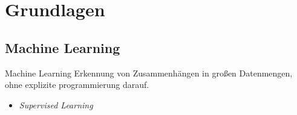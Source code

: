 \section[\thesection \  Grundlagen]{Grundlagen}\label{sec:grundlagen}



\subsection[\thesection .\thesubsection \ 
Machine Learning]{Machine Learning}\label{subsec:ml}


\begin{frame}{Machine Learning}
        Erkennung von Zusammenhängen in großen Datenmengen,\\ohne explizite programmierung darauf.
        \begin{itemize}
            \item \textit{Supervised Learning}
        \end{itemize}

        \begin{figure}[h]
            \centering
            \def\svgwidth{0.8\columnwidth}
            
        \end{figure}

\end{frame}

